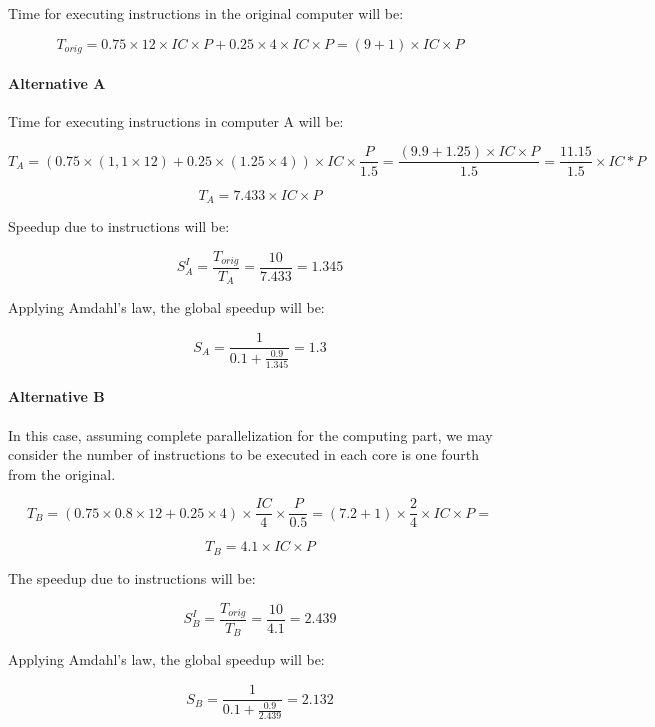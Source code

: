 Time for executing instructions in the original computer will be:

\begin{equation}
T_{orig} = 
0.75 \times 12 \times IC \times P + 0.25 \times 4 \times IC \times P = 
(9+1) \times IC \times P
\end{equation}

\paragraph{Alternative A}

Time for executing instructions in computer A will be:

\begin{equation}
T_{A} =
(0.75 \times (1,1 \times 12) + 0.25 \times (1.25 \times 4)) \times IC \times \frac{P}{1.5} = 
\frac{(9.9 + 1.25) \times IC  \times P}{1.5} = 
\frac{11.15}{1.5} \times IC * P 
\end{equation}

\begin{equation}
T_{A} = 7.433 \times IC \times P
\end{equation}

Speedup due to instructions will be:

\begin{equation}
S_{A}^{I} = 
\frac{T_{orig}}{T_{A}} = 
\frac{10}{7.433} = 
1.345
\end{equation}

Applying Amdahl's law, the global speedup will be:

\begin{equation}
S_{A} = \frac{1}{0.1 + \frac{0.9}{1.345}} = 1.3
\end{equation}

\paragraph{Alternative B}

In this case, assuming complete parallelization for the computing part,
we may consider the number of instructions to be executed in each core is
one fourth from the original.

\begin{equation}
T_{B} = 
(0.75 \times 0.8 \times 12 + 0.25 \times 4) \times \frac{IC}{4} \times \frac{P}{0.5} = 
( 7.2 + 1) \times \frac{2}{4} \times IC \times P = 
\end{equation}

\begin{equation}
T_{B} = 4.1 \times IC \times P
\end{equation}

The speedup due to instructions will be:

\begin{equation}
S^{I}_{B} = \frac{T_{orig}}{T_{B}} = \frac{10}{4.1} = 2.439
\end{equation}

Applying Amdahl's law, the global speedup will be:

\begin{equation}
S_{B} = \frac{1}{0.1 + \frac{0.9}{2.439}} = 2.132
\end{equation}

